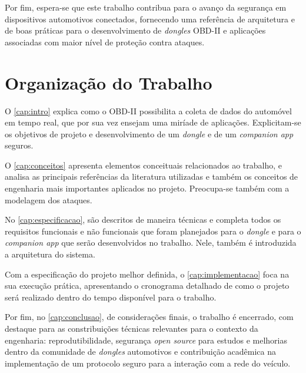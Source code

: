 Por fim, espera-se que este trabalho contribua para o avanço da segurança em dispositivos automotivos conectados, fornecendo uma referência de arquitetura e de boas práticas para o desenvolvimento de \textit{dongles} OBD-II e aplicações associadas com maior nível de proteção contra ataques.

\section{Organização do Trabalho}

O \autoref{cap:intro} explica como o OBD-II possibilita a coleta de dados do automóvel em tempo real, que por sua vez ensejam uma miríade de aplicações. Explicitam-se os objetivos de projeto e desenvolvimento de um \textit{dongle} e de um \textit{companion app} seguros.

O \autoref{cap:conceitos} apresenta elementos conceituais relacionados ao trabalho, e analisa as principais referências da literatura utilizadas e também os conceitos de engenharia mais importantes aplicados no projeto. Preocupa-se também com a modelagem dos ataques.

No \autoref{cap:especificacao}, são descritos de maneira técnicas e completa todos os requisitos funcionais e não funcionais que foram planejados para o \textit{dongle}  e para o \textit{companion app}  que serão desenvolvidos no trabalho.  Nele, também é introduzida a arquitetura do sistema.

Com a especificação do projeto melhor definida, o \autoref{cap:implementacao} foca na sua execução prática, apresentando o cronograma detalhado de como o projeto será realizado dentro do tempo disponível para o trabalho.

Por fim, no \autoref{cap:conclusao}, de considerações finais, o trabalho é encerrado, com destaque para as constribuições técnicas relevantes para o contexto da engenharia: reprodutibilidade, segurança \textit{open source} para estudos e melhorias dentro da comunidade de \textit{dongles} automotivos e contribuição acadêmica na implementação de um protocolo seguro para a interação com a rede do veículo.